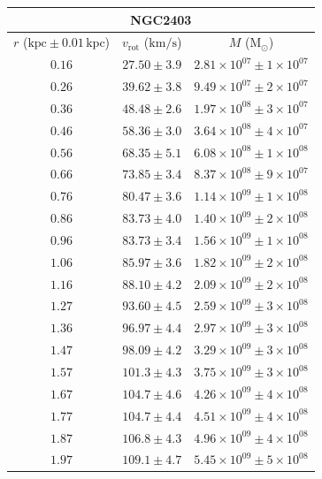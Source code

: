 \documentclass{article}
\newcommand\solmass{\textrm{M}_\odot}
\newcommand\kpc{\textrm{kpc}}
\newcommand\kmps{\textrm{km}/\textrm{s}}
\newcommand\vrot{\ensuremath{v_{\textrm{rot}}}}
\begin{document}
\begin{table}[h!]
    \begin{tabular}{|c|c|c|}
        \hline
        \multicolumn{3}{|c|}{NGC2403} \\
        \hline
        $r$ ($\kpc \pm 0.01 \,\kpc$) & $\vrot$ ($\kmps$) & $M$ ($\solmass$) \\
        \hline
        $0.16$ & $27.50 \pm 3.9$ & $2.81\times 10^{07} \pm 1\times 10^{07}$ \\
        $0.26$ & $39.62 \pm 3.8$ & $9.49\times 10^{07} \pm 2\times 10^{07}$ \\
        $0.36$ & $48.48 \pm 2.6$ & $1.97\times 10^{08} \pm 3\times 10^{07}$ \\
        $0.46$ & $58.36 \pm 3.0$ & $3.64\times 10^{08} \pm 4\times 10^{07}$ \\
        $0.56$ & $68.35 \pm 5.1$ & $6.08\times 10^{08} \pm 1\times 10^{08}$ \\
        $0.66$ & $73.85 \pm 3.4$ & $8.37\times 10^{08} \pm 9\times 10^{07}$ \\
        $0.76$ & $80.47 \pm 3.6$ & $1.14\times 10^{09} \pm 1\times 10^{08}$ \\
        $0.86$ & $83.73 \pm 4.0$ & $1.40\times 10^{09} \pm 2\times 10^{08}$ \\
        $0.96$ & $83.73 \pm 3.4$ & $1.56\times 10^{09} \pm 1\times 10^{08}$ \\
        $1.06$ & $85.97 \pm 3.6$ & $1.82\times 10^{09} \pm 2\times 10^{08}$ \\
        $1.16$ & $88.10 \pm 4.2$ & $2.09\times 10^{09} \pm 2\times 10^{08}$ \\
        $1.27$ & $93.60 \pm 4.5$ & $2.59\times 10^{09} \pm 3\times 10^{08}$ \\
        $1.36$ & $96.97 \pm 4.4$ & $2.97\times 10^{09} \pm 3\times 10^{08}$ \\
        $1.47$ & $98.09 \pm 4.2$ & $3.29\times 10^{09} \pm 3\times 10^{08}$ \\
        $1.57$ & $101.3 \pm 4.3$ & $3.75\times 10^{09} \pm 3\times 10^{08}$ \\
        $1.67$ & $104.7 \pm 4.6$ & $4.26\times 10^{09} \pm 4\times 10^{08}$ \\
        $1.77$ & $104.7 \pm 4.4$ & $4.51\times 10^{09} \pm 4\times 10^{08}$ \\
        $1.87$ & $106.8 \pm 4.3$ & $4.96\times 10^{09} \pm 4\times 10^{08}$ \\
        $1.97$ & $109.1 \pm 4.7$ & $5.45\times 10^{09} \pm 5\times 10^{08}$ \\

\end{tabular}
\end{table}
\end{document}
